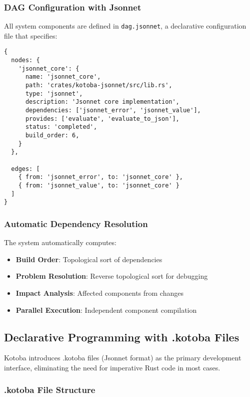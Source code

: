\documentclass[11pt,a4paper]{article}
\begin{document}
\subsubsection{DAG Configuration with Jsonnet}
\label{subsubsec:dag_config}

All system components are defined in \texttt{dag.jsonnet}, a declarative configuration file that specifies:

\begin{lstlisting}[language=jsonnet,caption=Example dag.jsonnet configuration]
{
  nodes: {
    'jsonnet_core': {
      name: 'jsonnet_core',
      path: 'crates/kotoba-jsonnet/src/lib.rs',
      type: 'jsonnet',
      description: 'Jsonnet core implementation',
      dependencies: ['jsonnet_error', 'jsonnet_value'],
      provides: ['evaluate', 'evaluate_to_json'],
      status: 'completed',
      build_order: 6,
    }
  },

  edges: [
    { from: 'jsonnet_error', to: 'jsonnet_core' },
    { from: 'jsonnet_value', to: 'jsonnet_core' }
  ]
}
\end{lstlisting}

\subsubsection{Automatic Dependency Resolution}
\label{subsubsec:dependency_resolution}

The system automatically computes:
\begin{itemize}
\item \textbf{Build Order}: Topological sort of dependencies
\item \textbf{Problem Resolution}: Reverse topological sort for debugging
\item \textbf{Impact Analysis}: Affected components from changes
\item \textbf{Parallel Execution}: Independent component compilation
\end{itemize}

\subsection{Declarative Programming with .kotoba Files}
\label{subsec:kotoba_files}

Kotoba introduces .kotoba files (Jsonnet format) as the primary development interface, eliminating the need for imperative Rust code in most cases.

\subsubsection{.kotoba File Structure}
\label{subsubsec:kotoba_structure}
\end{document}
